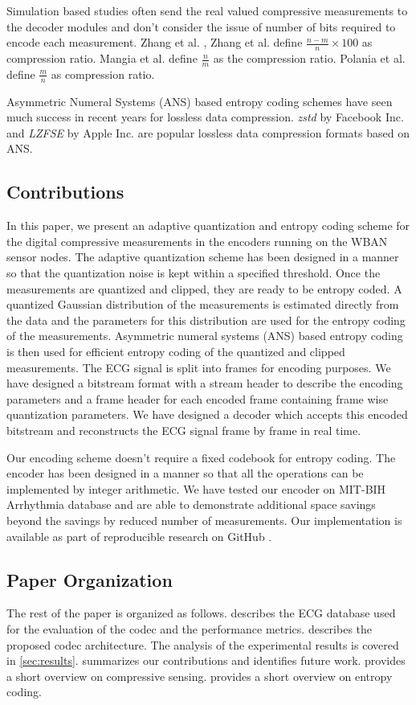 Simulation based studies often send the real valued compressive
measurements to the decoder modules and don't consider the issue
of number of bits required to encode each measurement.
Zhang et al. \cite{zhang2012compressed},
Zhang et al. \cite{zhang2021csnet} define
$\frac{n - m}{n} \times 100$ as compression ratio. 
Mangia et al. \cite{mangia2020deep} define $\frac{n}{m}$
as the compression ratio.
Polania et al. \cite{polania2018compressed} define
$\frac{m}{n}$ as compression ratio.

 Asymmetric Numeral Systems (ANS) \cite{duda2013asymmetric}
 based entropy coding schemes have seen much success
 in recent years for lossless data compression.
 \emph{zstd} by Facebook Inc. \cite{zstd}
 and \emph{LZFSE} by Apple Inc. are popular lossless
 data compression formats based on ANS.

\subsection{Contributions}
In this paper, we present an adaptive quantization and
entropy coding scheme for the digital compressive measurements
in the encoders running on the WBAN sensor nodes.
The adaptive quantization scheme has been designed in a manner
so that the quantization noise is kept within a specified
threshold. Once the measurements are quantized and clipped,
they are ready to be entropy coded. A quantized Gaussian
distribution of the measurements is estimated directly from
the data and the parameters for this distribution are used
for the entropy coding of the measurements.  
Asymmetric numeral systems (ANS) based
entropy coding is then used for efficient entropy coding
of the quantized and clipped measurements.
The ECG signal is split into frames for encoding purposes.
We have designed a bitstream format with a stream header
to describe the encoding parameters and a frame header
for each encoded frame containing frame wise quantization
parameters. We have designed a decoder which accepts this
encoded bitstream and reconstructs the ECG signal frame by
frame in real time. 

Our encoding scheme doesn't require a fixed codebook
for entropy coding. The encoder has been
designed in a manner so that all the operations can
be implemented by integer arithmetic. We have
tested our encoder on MIT-BIH Arrhythmia database
and are able to demonstrate additional space savings
beyond the savings by reduced number of measurements.
Our implementation is available as part of
reproducible research on GitHub \cite{kumar2022ecgcodec}.

\subsection{Paper Organization}
The rest of the paper is organized as follows.
 describes the ECG database
used for the evaluation of the codec and the
performance metrics.
 describes the proposed codec architecture.
The analysis of the experimental results is covered in \cref{sec:results}.
 summarizes our contributions and
identifies future work.
 provides a short overview on
compressive sensing.
 provides a short overview on
entropy coding.

